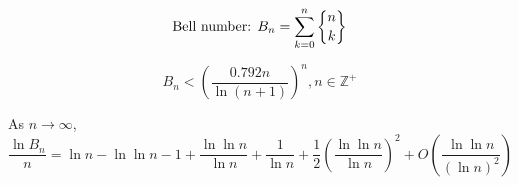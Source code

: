 \begin{frame}{}
  \[
    \text{Bell number: } B_n = \sum_{k=0}^{n} \stirling{n}{k}
  \]

  \pause
  \begin{theorem}
    \[
      B_n < \left( \frac{0.792 n}{\ln( n+1)} \right)^n, n \in \mathbb{Z}^{+}
    \]
  \end{theorem}

  \pause
  \vspace{0.50cm}
  \begin{theorem}[de Bruijn (1981)]
    As $n \to \infty$,
    \[
      \frac{\ln B_n}{n} = \ln n - \ln \ln n - 1 + \frac{\ln \ln n}{\ln n} + \frac{1}{\ln n} 
      + \frac{1}{2}\left(\frac{\ln \ln n}{\ln n}\right)^2 + O\left(\frac{\ln \ln n}{(\ln n)^2} \right)
    \]
  \end{theorem}
\end{frame}
